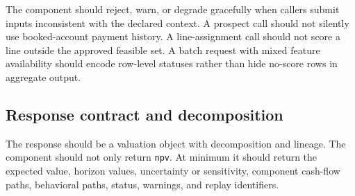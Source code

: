 \documentclass[11pt]{article}
\newcommand{\1}{\mathbf{1}}
\newcommand{\code}[1]{\nolinkurl{#1}}
\begin{document}
The component should reject, warn, or degrade gracefully when callers submit
inputs inconsistent with the declared context. A prospect call should not
silently use booked-account payment history. A line-assignment call should not
score a line outside the approved feasible set. A batch request with mixed
feature availability should encode row-level statuses rather than hide no-score
rows in aggregate output.

\subsection{Response contract and decomposition}
\label{subsec:response-contract}

The response should be a valuation object with decomposition and lineage. The
component should not only return \code{npv}. At minimum it should return the
expected value, horizon values, uncertainty or sensitivity, component
cash-flow paths, behavioral paths, status, warnings, and replay identifiers.
\end{document}
